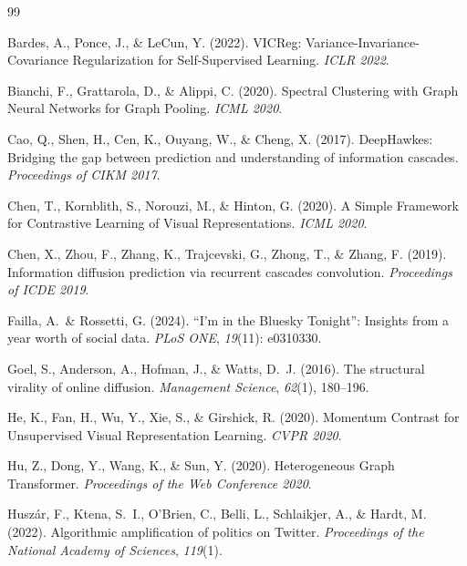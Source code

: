 \documentclass[12pt, a4paper]{article}
\begin{document}
\begin{thebibliography}{99}

Bardes, A., Ponce, J., \& LeCun, Y. (2022).
VICReg: Variance-Invariance-Covariance Regularization for Self-Supervised Learning.
\textit{ICLR 2022}.

Bianchi, F., Grattarola, D., \& Alippi, C. (2020).
Spectral Clustering with Graph Neural Networks for Graph Pooling.
\textit{ICML 2020}.

Cao, Q., Shen, H., Cen, K., Ouyang, W., \& Cheng, X. (2017).
DeepHawkes: Bridging the gap between prediction and understanding of information cascades.
\textit{Proceedings of CIKM 2017}.

Chen, T., Kornblith, S., Norouzi, M., \& Hinton, G. (2020).
A Simple Framework for Contrastive Learning of Visual Representations.
\textit{ICML 2020}.

Chen, X., Zhou, F., Zhang, K., Trajcevski, G., Zhong, T., \& Zhang, F. (2019).
Information diffusion prediction via recurrent cascades convolution.
\textit{Proceedings of ICDE 2019}.

Failla, A.\ \& Rossetti, G. (2024).
``I'm in the Bluesky Tonight'': Insights from a year worth of social data.
\textit{PLoS ONE}, \textit{19}(11): e0310330.

Goel, S., Anderson, A., Hofman, J., \& Watts, D.\ J. (2016).
The structural virality of online diffusion.
\textit{Management Science}, \textit{62}(1), 180--196.

He, K., Fan, H., Wu, Y., Xie, S., \& Girshick, R. (2020).
Momentum Contrast for Unsupervised Visual Representation Learning.
\textit{CVPR 2020}.

Hu, Z., Dong, Y., Wang, K., \& Sun, Y. (2020).
Heterogeneous Graph Transformer.
\textit{Proceedings of the Web Conference 2020}.

Husz\'{a}r, F., Ktena, S.\ I., O'Brien, C., Belli, L., Schlaikjer, A., \& Hardt, M. (2022).
Algorithmic amplification of politics on Twitter.
\textit{Proceedings of the National Academy of Sciences}, \textit{119}(1).


\end{thebibliography}
\end{document}
